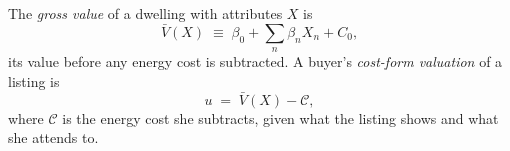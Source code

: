 \label{def:cost_form}
The \emph{gross value} of a dwelling with attributes $X$ is
\begin{equation}
    \bar V(X)\;\equiv\;\beta_0+\sum_n\beta_nX_n+C_0,
    \label{eq:gross_value}
\end{equation}
its value before any energy cost is subtracted. A buyer's \emph{cost-form valuation} of a listing is
\begin{equation}
    u\;=\;\bar V(X)-\mathcal C,
    \label{eq:cost_valuation}
\end{equation}
where $\mathcal C$ is the energy cost she subtracts, given what the listing shows and what she attends to.
